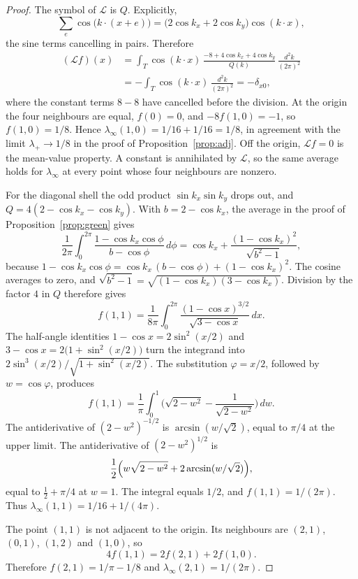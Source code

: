 \begin{proof}
The symbol of \(\mathcal{L}\) is \(Q\).
Explicitly,
\[
\sum_{e}\cos\bigl(k\cdot(x+e)\bigr)
=\bigl(2\cos k_x+2\cos k_y\bigr)\cos(k\cdot x),
\]
the sine terms cancelling in pairs.
Therefore
\begin{align*}
(\mathcal{L}f)(x)
&=\int_T\cos(k\cdot x)\,
\frac{-8+4\cos k_x+4\cos k_y}{Q(k)}
\,\frac{d^2k}{(2\pi)^2}\\
&=-\int_T\cos(k\cdot x)\,\frac{d^2k}{(2\pi)^2}
=-\delta_{x0},
\end{align*}
where the constant terms \(8-8\) have cancelled before the division.
At the origin the four neighbours are equal, \(f(0)=0\), and
\(-8f(1,0)=-1\), so \(f(1,0)=1/8\).
Hence \(\lambda_\infty(1,0)=1/16+1/16=1/8\), in agreement with the limit
\(\lambda_+\to 1/8\) in the proof of Proposition~\ref{prop:adj}.
Off the origin, \(\mathcal{L}f=0\) is the mean-value property.
A constant is annihilated by \(\mathcal{L}\), so the same average holds for
\(\lambda_\infty\) at every point whose four neighbours are nonzero.

For the diagonal shell the odd product \(\sin k_x\sin k_y\) drops out, and
\(Q=4(2-\cos k_x-\cos k_y)\).
With \(b=2-\cos k_x\), the average in the proof of
Proposition~\ref{prop:green} gives
\[
\frac{1}{2\pi}\int_0^{2\pi}
\frac{1-\cos k_x\cos\phi}{b-\cos\phi}\,d\phi
=\cos k_x+\frac{(1-\cos k_x)^2}{\sqrt{b^2-1}},
\]
because \(1-\cos k_x\cos\phi=\cos k_x\,(b-\cos\phi)+(1-\cos k_x)^2\).
The cosine averages to zero, and
\(\sqrt{b^2-1}=\sqrt{(1-\cos k_x)(3-\cos k_x)}\).
Division by the factor \(4\) in \(Q\) therefore gives
\[
f(1,1)
=\frac{1}{8\pi}\int_0^{2\pi}
\frac{(1-\cos x)^{3/2}}{\sqrt{3-\cos x}}\,dx.
\]
The half-angle identities
\(1-\cos x=2\sin^2(x/2)\) and \(3-\cos x=2\bigl(1+\sin^2(x/2)\bigr)\)
turn the integrand into \(2\sin^3(x/2)/\sqrt{1+\sin^2(x/2)}\).
The substitution \(\varphi=x/2\), followed by \(w=\cos\varphi\), produces
\[
f(1,1)
=\frac{1}{\pi}\int_0^1
\Biggl(\sqrt{2-w^2}-\frac{1}{\sqrt{2-w^2}}\Biggr)\,dw.
\]
The antiderivative of \((2-w^2)^{-1/2}\) is \(\arcsin(w/\sqrt{2})\),
equal to \(\pi/4\) at the upper limit.
The antiderivative of \((2-w^2)^{1/2}\) is
\[
\frac12\Bigl(w\sqrt{2-w^2}+2\arcsin(w/\sqrt{2})\Bigr),
\]
equal to \(\tfrac12+\pi/4\) at \(w=1\).
The integral equals \(1/2\), and \(f(1,1)=1/(2\pi)\).
Thus \(\lambda_\infty(1,1)=1/16+1/(4\pi)\).

The point \((1,1)\) is not adjacent to the origin.
Its neighbours are \((2,1)\), \((0,1)\), \((1,2)\) and \((1,0)\), so
\[
4f(1,1)=2f(2,1)+2f(1,0).
\]
Therefore \(f(2,1)=1/\pi-1/8\) and
\(\lambda_\infty(2,1)=1/(2\pi)\).


\end{proof}
